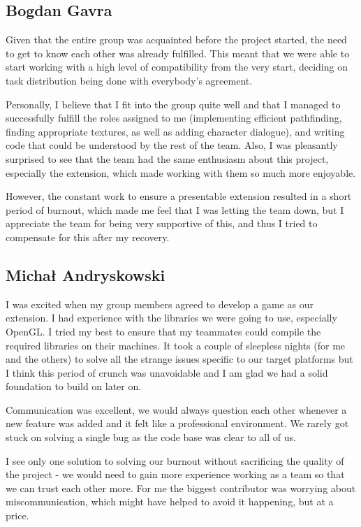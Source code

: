 \documentclass{article}
\begin{document}
\subsection{Bogdan Gavra}
Given that the entire group was acquainted before the project started, the need to get to know each other was already fulfilled. This meant that we were able to start working with a high level of compatibility from the very start, deciding on task distribution being done with everybody's agreement.\par
Personally, I believe that I fit into the group quite well and that I managed to successfully fulfill the roles assigned to me (implementing efficient pathfinding, finding appropriate textures, as well as adding character dialogue), and writing code that could be understood by the rest of the team. Also, I was pleasantly surprised to see that the team had the same enthusiasm about this project, especially the extension, which made working with them so much more enjoyable.\par
However, the constant work to ensure a presentable extension resulted in a short period of burnout, which made me feel that I was letting the team down, but I appreciate the team for being very supportive of this, and thus I tried to compensate for this after my recovery.
\subsection{Michał Andryskowski}
I was excited when my group members agreed to develop a game as our extension. I had experience with the libraries we were going to use, especially OpenGL. I tried my best to ensure that my teammates could compile the required libraries on their machines. It took a couple of sleepless nights (for me and the others) to solve all the strange issues specific to our target platforms but I think this period of crunch was unavoidable and I am glad we had a solid foundation to build on later on. \par
Communication was excellent, we would always question each other whenever a new feature was added and it felt like a professional environment. We rarely got stuck on solving a single bug as the code base was clear to all of us. \par
I see only one solution to solving our burnout without sacrificing the quality of the project - we would need to gain more experience working as a team so that we can trust each other more. For me the biggest contributor was worrying about miscommunication, which might have helped to avoid it happening, but at a price.
\end{document}
